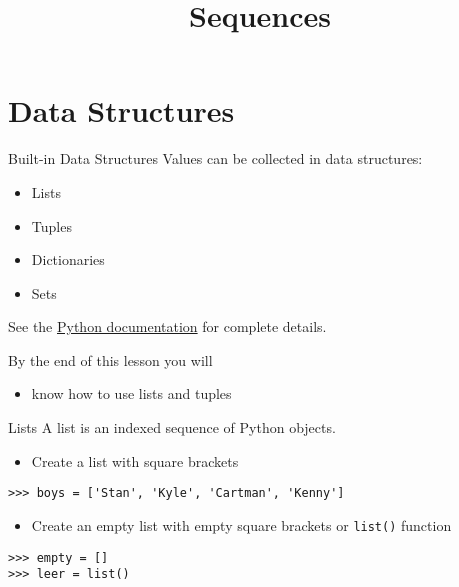 \documentclass[smaller, aspectratio=1610]{beamer}
\date{}
\title{Sequences}
\begin{document}
\maketitle

\section{Data Structures}
\label{sec:org48b2dfb}

\begin{frame}[label={sec:org89144bd}]{Built-in Data Structures}
Values can be collected in data structures:

\begin{itemize}
\item Lists
\item Tuples
\item Dictionaries
\item Sets
\end{itemize}

See the \href{https://docs.python.org/3.6/library/stdtypes.html}{Python documentation} for
complete details.

By the end of this lesson you will

\begin{itemize}
\item know how to use lists and tuples
\end{itemize}
\end{frame}

\begin{frame}[label={sec:org13033fb},fragile]{Lists}
 A list is an indexed sequence of Python objects.

\begin{itemize}
\item Create a list with square brackets
\end{itemize}

\lstset{language=Python,label= ,caption= ,captionpos=b,numbers=none}
\begin{lstlisting}
>>> boys = ['Stan', 'Kyle', 'Cartman', 'Kenny']
\end{lstlisting}

\begin{itemize}
\item Create an empty list with empty square brackets or \texttt{list()} function
\end{itemize}

\lstset{language=Python,label= ,caption= ,captionpos=b,numbers=none}
\begin{lstlisting}
>>> empty = []
>>> leer = list()
\end{lstlisting}
\end{frame}
\end{document}
